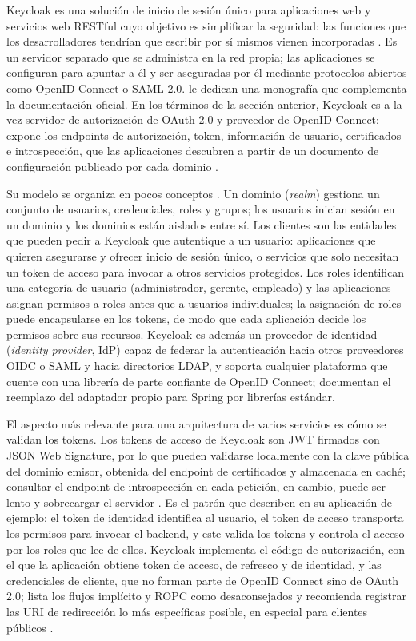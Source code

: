 Keycloak es una solución de inicio de sesión único para aplicaciones web y servicios web RESTful cuyo objetivo es simplificar la seguridad: las funciones que los desarrolladores tendrían que escribir por sí mismos vienen incorporadas \parencite{KeycloakServerAdmin}. Es un servidor separado que se administra en la red propia; las aplicaciones se configuran para apuntar a él y ser aseguradas por él mediante protocolos abiertos como OpenID Connect o SAML 2.0. \textcite{Thorgersen2023} le dedican una monografía que complementa la documentación oficial. En los términos de la sección anterior, Keycloak es a la vez servidor de autorización de OAuth 2.0 y proveedor de OpenID Connect: expone los endpoints de autorización, token, información de usuario, certificados e introspección, que las aplicaciones descubren a partir de un documento de configuración publicado por cada dominio \parencite{KeycloakSecuringApps}.

Su modelo se organiza en pocos conceptos \parencite{KeycloakServerAdmin}. Un dominio (\textit{realm}) gestiona un conjunto de usuarios, credenciales, roles y grupos; los usuarios inician sesión en un dominio y los dominios están aislados entre sí. Los clientes son las entidades que pueden pedir a Keycloak que autentique a un usuario: aplicaciones que quieren asegurarse y ofrecer inicio de sesión único, o servicios que solo necesitan un token de acceso para invocar a otros servicios protegidos. Los roles identifican una categoría de usuario (administrador, gerente, empleado) y las aplicaciones asignan permisos a roles antes que a usuarios individuales; la asignación de roles puede encapsularse en los tokens, de modo que cada aplicación decide los permisos sobre sus recursos. Keycloak es además un proveedor de identidad (\textit{identity provider}, IdP) capaz de federar la autenticación hacia otros proveedores OIDC o SAML y hacia directorios LDAP, y soporta cualquier plataforma que cuente con una librería de parte confiante de OpenID Connect; \textcite{Thorgersen2023} documentan el reemplazo del adaptador propio para Spring por librerías estándar.

El aspecto más relevante para una arquitectura de varios servicios es cómo se validan los tokens. Los tokens de acceso de Keycloak son JWT firmados con JSON Web Signature, por lo que pueden validarse localmente con la clave pública del dominio emisor, obtenida del endpoint de certificados y almacenada en caché; consultar el endpoint de introspección en cada petición, en cambio, puede ser lento y sobrecargar el servidor \parencite{KeycloakSecuringApps}. Es el patrón que \textcite{Thorgersen2023} describen en su aplicación de ejemplo: el token de identidad identifica al usuario, el token de acceso transporta los permisos para invocar el backend, y este valida los tokens y controla el acceso por los roles que lee de ellos. Keycloak implementa el código de autorización, con el que la aplicación obtiene token de acceso, de refresco y de identidad, y las credenciales de cliente, que no forman parte de OpenID Connect sino de OAuth 2.0; lista los flujos implícito y ROPC como desaconsejados y recomienda registrar las URI de redirección lo más específicas posible, en especial para clientes públicos \parencite{KeycloakSecuringApps}.

